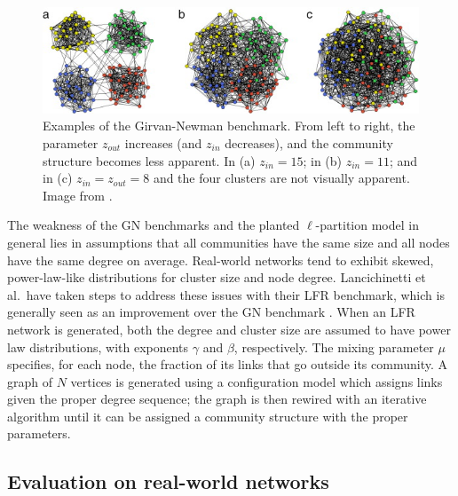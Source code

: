 \begin{figure}
\centering
\includegraphics{img/guimera2005_fig1_gm-benchmarks.jpeg}
\caption{Examples of the Girvan-Newman benchmark. From left to right,
the parameter \(z_{out}\) increases (and \(z_{in}\) decreases), and the
community structure becomes less apparent. In (a) \(z_{in}=15\); in (b)
\(z_{in}=11\); and in (c) \(z_{in} = z_{out} = 8\) and the four clusters
are not visually apparent. Image from
\autocite{guimera_functional_2005}.}\label{fig:gn_benchmarks}
\end{figure}

The weakness of the GN benchmarks and the planted \(\ell\)-partition
model in general lies in assumptions that all communities have the same
size and all nodes have the same degree on average. Real-world networks
tend to exhibit skewed, power-law-like distributions for cluster size
and node degree. Lancichinetti et al.~have taken steps to address these
issues with their LFR benchmark, which is generally seen as an
improvement over the GN benchmark
\autocites{lancichinetti_benchmark_2008}{fortunato_community_2010}. When
an LFR network is generated, both the degree and cluster size are
assumed to have power law distributions, with exponents \(\gamma\) and
\(\beta\), respectively. The mixing parameter \(\mu\) specifies, for
each node, the fraction of its links that go outside its community. A
graph of \(N\) vertices is generated using a configuration model which
assigns links given the proper degree sequence; the graph is then
rewired with an iterative algorithm until it can be assigned a community
structure with the proper parameters.

\subsection{Evaluation on real-world
networks}\label{evaluation-on-real-world-networks}

